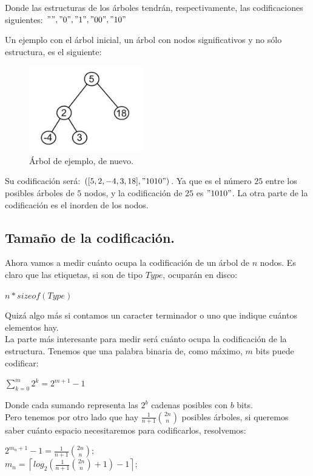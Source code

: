 \documentclass{article}
\begin{document}
Donde las estructuras de los árboles tendrán, respectivamente, las codificaciones siguientes:
 $"", "0", "1", "00", "10"$
\newpage

Un ejemplo con el árbol inicial, un árbol con nodos significativos y no sólo estructura, es el siguiente:
\begin{figure}[htbp]
\centering
\includegraphics[width=50mm]{ejemplo.jpeg}
\caption{Árbol de ejemplo, de nuevo.}
\label{overflow}
\end{figure}

Su codificación será: $([5,2,-4,3,18],"1010")$.
Ya que es el número $25$ entre los posibles árboles de $5$ nodos, y la codificación de $25$ es $"1010"$.
La otra parte de la codificación es el inorden de los nodos.



\subsection {Tamaño de la codificación.}

Ahora vamos a medir cuánto ocupa la codificación de un árbol de $n$ nodos.
Es claro que las etiquetas, si son de tipo $Type$, ocuparán en disco:
\begin{adjustwidth}{2cm}{}
 $n * sizeof(Type)$
\end{adjustwidth}
Quizá algo más si contamos un caracter terminador o uno que indique cuántos elementos hay.\\

La parte más interesante para medir será cuánto ocupa la codificación de la estructura.
Tenemos que una palabra binaria de, como máximo, $m$ bits puede codificar:
\begin{adjustwidth}{2cm}{}
 $\displaystyle \sum_{k=0}^{m} 2^{k} = 2^{m+1} - 1$
\end{adjustwidth}
Donde cada sumando representa las $2^b$ cadenas posibles con $b$ bits.\\

Pero tenemos por otro lado que hay $\frac{1}{n+1} {2n \choose n}$ posibles árboles, si queremos saber
cuánto espacio necesitaremos para codificarlos, resolvemos:
\begin{adjustwidth}{2cm}{}
 $\displaystyle 2^{m_n+1} - 1 = \frac{1}{n+1} {2n \choose n};$ \\
 $\displaystyle m_n = \left\lceil log_2 \left( \frac{1}{n+1} {2n \choose n} + 1 \right) - 1 \right\rceil;$ \\
\end{adjustwidth}
\end{document}
